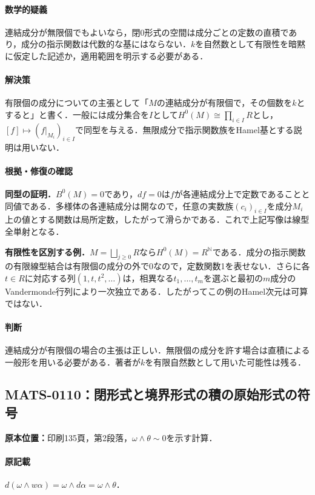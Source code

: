\documentclass[a4paper,10pt]{ltjsarticle}
\begin{document}
\paragraph{数学的疑義}連結成分が無限個でもよいなら，閉0形式の空間は成分ごとの定数の直積であり，成分の指示関数は代数的な基にはならない．$k$を自然数として有限性を暗黙に仮定した記述か，適用範囲を明示する必要がある．

\paragraph{解決策}有限個の成分についての主張として「$M$の連結成分が有限個で，その個数を$k$とすると」と書く．一般には成分集合を$I$として$H^0(M)\cong\prod_{i\in I}R$とし，$[f]\mapsto(f|_{M_i})_{i\in I}$で同型を与える．無限成分で指示関数族をHamel基とする説明は用いない．

\paragraph{根拠・修復の確認}\textbf{同型の証明．}$B^0(M)=0$であり，$df=0$は$f$が各連結成分上で定数であることと同値である．多様体の各連結成分は開なので，任意の実数族$(c_i)_{i\in I}$を成分$M_i$上の値とする関数は局所定数，したがって滑らかである．これで上記写像は線型全単射となる．\par\textbf{有限性を区別する例．}$M=\bigsqcup_{j\geq0}R$なら$H^0(M)=R^{\mathbb N}$である．成分の指示関数の有限線型結合は有限個の成分の外で0なので，定数関数1を表せない．さらに各$t\in R$に対応する列$(1,t,t^2,\ldots)$は，相異なる$t_1,\ldots,t_m$を選ぶと最初の$m$成分のVandermonde行列により一次独立である．したがってこの例のHamel次元は可算ではない．

\paragraph{判断}連結成分が有限個の場合の主張は正しい．無限個の成分を許す場合は直積による一般形を用いる必要がある．著者が$k$を有限自然数として用いた可能性は残る．


\subsection*{MATS-0110：閉形式と境界形式の積の原始形式の符号}\label{math:MATS-0110}
\noindent\textbf{原本位置：}印刷135頁，第2段落，$\omega\wedge\theta\sim0$を示す計算．

\paragraph{原記載}$d(\omega\wedge w\alpha)=\omega\wedge d\alpha=\omega\wedge\theta$．
\end{document}

